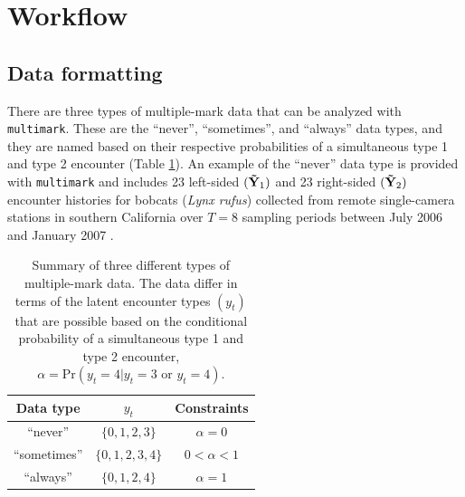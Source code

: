 \documentclass[12pt]{article}
\begin{document}
\section{Workflow}
\subsection{Data formatting}
There are three types of multiple-mark data that can be analyzed with \verb|multimark|. These are the ``never'', ``sometimes'', and ``always'' data types, and they are named based on their respective probabilities of a simultaneous type 1 and type 2 encounter (Table \ref{tab:datatypes}). An example of the ``never'' data type is provided with \verb|multimark| and includes 23 left-sided $({\bf {\tilde Y}}_1)$ and 23 right-sided $({\bf {\tilde Y}}_2)$ encounter histories for bobcats ({\it Lynx rufus}) collected from remote single-camera stations in southern California over $T=8$ sampling periods between July 2006 and January 2007 \citep{McClintockEtAl2013a,AlonsoEtAl2015}. 

\begin{table}
  \caption{\label{tab:datatypes} Summary of three different types of multiple-mark data. The data differ in terms of the latent encounter types $(y_t)$ that are possible based on the conditional probability of a simultaneous type 1 and type 2 encounter, $\alpha = \text{Pr}\left( y_t=4|y_t=3 \text{ or } y_t=4 \right)$.}
  \begin{tabular}{c|cc}
  \hline 
  Data type & $y_t$ &  Constraints \tabularnewline
  \hline 
  ``never'' & $\{0,1,2,3\}$ & $\alpha=0$ \tabularnewline
  ``sometimes'' & $\{0,1,2,3,4\}$ & $0<\alpha<1$ \tabularnewline
  ``always'' & $\{0,1,2,4\}$ & $\alpha=1$ \tabularnewline
  \hline 
  \end{tabular}
\end{table}
\end{document}

